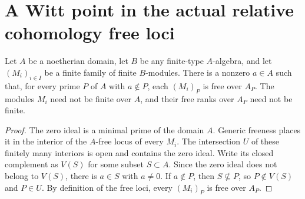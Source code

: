 \section{A Witt point in the actual relative cohomology free loci}

\begin{lemma}
\label{lem:kn-relative-arithmetic-simultaneous-free-open}
\leanok
Let $A$ be a noetherian domain, let $B$ be any finite-type $A$-algebra,
and let $(M_i)_{i\in I}$ be a finite family of finite $B$-modules.
There is a nonzero $a\in A$ such that, for every prime $P$ of $A$
with $a\notin P$, each $(M_i)_P$ is free over $A_P$.
The modules $M_i$ need not be finite over $A$, and their free ranks
over $A_P$ need not be finite.
\end{lemma}
\begin{proof}
The zero ideal is a minimal prime of the domain $A$.  Generic freeness
places it in the interior of the $A$-free locus of every $M_i$.
The intersection $U$ of these finitely many interiors is open and
contains the zero ideal.  Write its closed complement as $V(S)$ for
some subset $S\subset A$.  Since the zero ideal does not belong to
$V(S)$, there is $a\in S$ with $a\ne0$.  If $a\notin P$, then
$S\nsubseteq P$, so $P\notin V(S)$ and $P\in U$.  By definition of
the free loci, every $(M_i)_P$ is free over $A_P$.
\end{proof}

